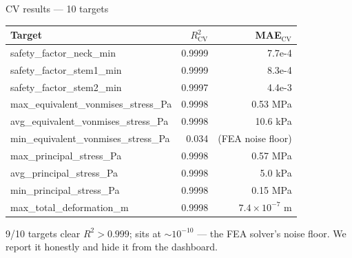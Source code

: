 \begin{frame}{CV results --- 10 targets}
  \begin{center}\footnotesize
    \begin{tabular}{lrr}
      \toprule
      Target & \(R^2_{\text{CV}}\) & MAE\(_{\text{CV}}\) \\
      \midrule
      safety\_factor\_neck\_min            & 0.9999 & 7.7e-4 \\
      safety\_factor\_stem1\_min           & 0.9999 & 8.3e-4 \\
      safety\_factor\_stem2\_min           & 0.9997 & 4.4e-3 \\
      max\_equivalent\_vonmises\_stress\_Pa & 0.9998 & 0.53 MPa \\
      avg\_equivalent\_vonmises\_stress\_Pa & 0.9998 & 10.6 kPa \\
      \alert{min\_equivalent\_vonmises\_stress\_Pa} & \alert{0.034} & \alert{(FEA noise floor)} \\
      max\_principal\_stress\_Pa            & 0.9998 & 0.57 MPa \\
      avg\_principal\_stress\_Pa            & 0.9998 & 5.0 kPa \\
      min\_principal\_stress\_Pa            & 0.9998 & 0.15 MPa \\
      max\_total\_deformation\_m            & 0.9998 & \(7.4 \times 10^{-7}\) m \\
      \bottomrule
    \end{tabular}
  \end{center}

  \vspace{0.4cm}
  9/10 targets clear \(R^2 > 0.999\);  sits at
  \(\sim 10^{-10}\) --- the FEA solver's noise floor. We report it honestly
  and hide it from the dashboard.
\end{frame}


